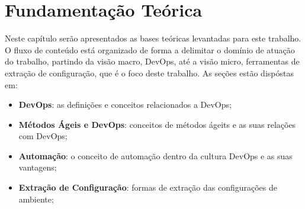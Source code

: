 \chapter{Fundamentação Teórica}
\label{chap:teoria}

Neste capítulo serão apresentados as bases teóricas levantadas para este trabalho.
O fluxo de conteúdo está organizado de forma a delimitar o domínio de atuação
do trabalho, partindo da visão macro, DevOps, até a visão micro, ferramentas de
extração de configuração, que é o foco deste trabalho. As seções estão dispóstas em:

\begin{itemize}
  \item \textbf{DevOps}: as definições e conceitos relacionados a DevOps;
  \item \textbf{Métodos Ágeis e DevOps}: conceitos de métodos ágeits e as suas relações com DevOps;
  \item \textbf{Automação}: o conceito de automação dentro da cultura DevOps e as suas vantagens;
  \item \textbf{Extração de Configuração}: formas de extração das configurações de ambiente;
\end{itemize}




